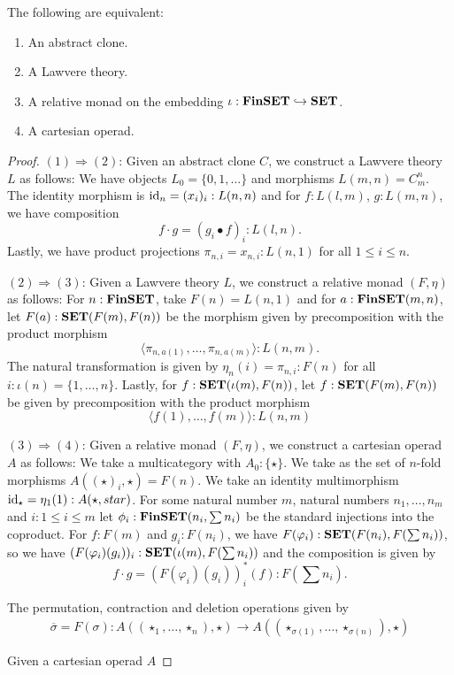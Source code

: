 \begin{lemma}
  The following are equivalent:
  \begin{enumerate}[(1)]
    \item An abstract clone.
    \item A Lawvere theory.
    \item A relative monad on the embedding $ \iota: \mathbf{FinSET} \hookrightarrow \mathbf{SET} $.
    \item A cartesian operad.
  \end{enumerate}
\end{lemma}
\begin{proof}
  $ (1) \Rightarrow (2) $: Given an abstract clone $ C $, we construct a Lawvere theory $ L $ as follows: We have objects $ L_0 = \{ 0, 1, \dots \} $ and morphisms $ L(m, n) = C_m^n $. The identity morphism is $ \text{id}_{n} = (x_i)_i : L(n, n) $ and for $ f: L(l, m) $, $ g: L(m, n) $, we have composition
  \[ f \cdot g = (g_i \bullet f)_i: L(l, n). \]
  Lastly, we have product projections $ \pi_{n, i} = x_{n, i}: L(n, 1) $ for all $ 1 \leq i \leq n $.

  $ (2) \Rightarrow (3) $: Given a Lawvere theory $ L $, we construct a relative monad $ (F, \eta) $ as follows: For $ n: \mathbf{FinSET} $, take $ F(n) = L(n, 1) $ and for $ a: \mathbf{FinSET}(m, n) $, let $ F(a): \mathbf{SET}(F(m), F(n)) $ be the morphism given by precomposition with the product morphism
  \[ \langle \pi_{n, a(1)}, \dots, \pi_{n, a(m)} \rangle : L(n, m). \]
  The natural transformation is given by $ \eta_n(i) = \pi_{n, i}: F(n) $ for all $ i: \iota(n) = \{1, \dots, n\} $. Lastly, for $ f: \mathbf{SET}(\iota(m), F(n)) $, let $ f : \mathbf{SET}(F(m), F(n)) $ be given by precomposition with the product morphism
  \[ \langle f(1), \dots, f(m) \rangle : L(n, m) \]

  $ (3) \Rightarrow (4) $: Given a relative monad $ (F, \eta) $, we construct a cartesian operad $ A $ as follows: We take a multicategory with $ A_0: \{ \star \} $. We take as the set of $ n $-fold morphisms $ A((\star)_i, \star) = F(n) $. We take an identity multimorphism $ \text{id}_{\star} = \eta_1(1) : A(\star, star) $.
  For some natural number $ m $, natural numbers $ n_1, \dots, n_m $ and $ i: 1 \leq i \leq m $ let $ \phi_i: \mathbf{FinSET}(n_i, \sum n_i) $ be the standard injections into the coproduct. For $ f: F(m) $ and $ g_i: F(n_i) $, we have $ F(\varphi_i): \mathbf{SET}(F(n_i), F(\sum n_i)) $, so we have $ (F(\varphi_i)(g_i))_i: \mathbf{SET}(\iota(m), F(\sum n_i)) $ and the composition is given by
  \[ f \cdot g = (F(\varphi_i)(g_i))_i^*(f): F\left(\sum n_i\right). \]

  The permutation, contraction and deletion operations given by
  \begin{align*}
    \overline{\sigma} = F(\sigma): A((\star_1, \dots, \star_n), \star) \to A((\star_{\sigma(1)}, \dots, \star_{\sigma(n)}), \star)
  \end{align*}

  Given a cartesian operad $ A $
  \TODO
\end{proof}
